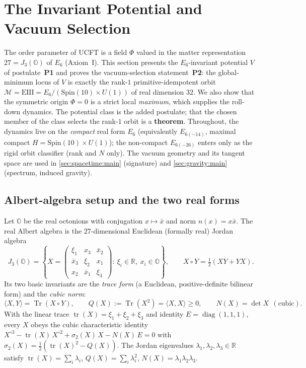 \section{The Invariant Potential and Vacuum Selection}
\label{sec:potential:main}
\label{sec:vacuum}

The order parameter of UCFT is a field $\Phi$ valued in the matter representation
$27=J_3(\mathbb O)$ of $E_6$ (Axiom~I). This section presents the $E_6$-invariant potential
$V$ of postulate~\textbf{P1} and proves the vacuum-selection statement~\textbf{P2}: the
global-minimum locus of $V$ is exactly the rank-$1$ primitive-idempotent orbit
$\mathcal M=\mathrm{EIII}=E_6/(\mathrm{Spin}(10)\times U(1))$ of real dimension $32$. We also
show that the symmetric origin $\Phi=0$ is a strict local \emph{maximum}, which supplies the
roll-down dynamics. The potential class is the added postulate; that the chosen member of the
class selects the rank-$1$ orbit is a \textbf{theorem}. Throughout, the dynamics live on the
\emph{compact} real form $E_6$ (equivalently $E_{6(-14)}$, maximal compact
$H=\mathrm{Spin}(10)\times U(1)$); the non-compact $E_{6(-26)}$ enters only as the rigid
orbit classifier (rank and $N$ only). The vacuum geometry and its tangent space are used in
\autoref{sec:spacetime:main} (signature) and \autoref{sec:gravity:main} (spectrum, induced
gravity).

\subsection{Albert-algebra setup and the two real forms}
\label{sec:potential:setup}

Let $\mathbb O$ be the real octonions with conjugation $x\mapsto\bar x$ and norm
$n(x)=x\bar x$. The real Albert algebra is the $27$-dimensional Euclidean (formally real)
Jordan algebra
\begin{equation}
\label{eq:potential:albert}
J_3(\mathbb O)=\left\{
X=\begin{pmatrix}\xi_1 & x_3 & \bar x_2\\ \bar x_3 & \xi_2 & x_1\\ x_2 & \bar x_1 & \xi_3\end{pmatrix}
:\ \xi_i\in\mathbb R,\ x_i\in\mathbb O\right\},
\qquad X\circ Y=\tfrac12(XY+YX).
\end{equation}
Its two basic invariants are the \emph{trace form} (a Euclidean, positive-definite bilinear
form) and the \emph{cubic norm}:
\begin{equation}
\label{eq:potential:invariants}
\langle X,Y\rangle=\operatorname{Tr}(X\circ Y),\qquad
Q(X):=\operatorname{Tr}(X^2)=\langle X,X\rangle\ge0,\qquad
N(X)=\det X\ \ (\text{cubic}).
\end{equation}
With the linear trace $\operatorname{tr}(X)=\xi_1+\xi_2+\xi_3$ and identity
$E=\operatorname{diag}(1,1,1)$, every $X$ obeys the cubic characteristic identity
$X^{\circ3}-\operatorname{tr}(X)\,X^{\circ2}+\sigma_2(X)\,X-N(X)\,E=0$ with
$\sigma_2(X)=\tfrac12(\operatorname{tr}(X)^2-Q(X))$. The Jordan eigenvalues
$\lambda_1,\lambda_2,\lambda_3\in\mathbb R$ satisfy
$\operatorname{tr}(X)=\sum_i\lambda_i$, $Q(X)=\sum_i\lambda_i^2$,
$N(X)=\lambda_1\lambda_2\lambda_3$.

